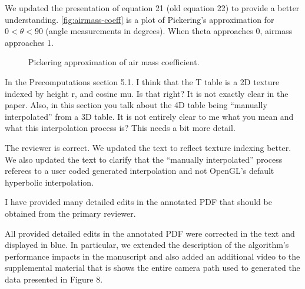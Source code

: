 \documentclass{article}
\begin{document}
We updated the presentation of equation 21 (old equation 22) to provide a better understanding. \autoref{fig:airmass-coeff} is a plot of Pickering's approximation for $0 < \theta < 90$ (angle measurements in degrees). When theta approaches 0, airmass approaches 1.

\begin{figure}[htb]
 \centering 
 \caption{Pickering approximation of air mass coefficient.}
 \label{fig:airmass-coeff}
\end{figure}

\vspace*{1cm}
\begin{tcolorbox}
In the Precomputations section 5.1. I think that the T table is a 2D texture indexed by height r, and cosine mu. Is that right? It is not exactly clear in the paper. Also, in this section you talk about the 4D table being ``manually interpolated'' from a 3D table. It is not entirely clear to me what you mean and what this interpolation process is? This needs a bit more detail.
\end{tcolorbox}

The reviewer is correct. We updated the text to reflect texture indexing better.
We also updated the text to clarify that the ``manually interpolated'' process referees to a user coded generated interpolation and not OpenGL's default hyperbolic interpolation. 

\vspace*{1cm}
\begin{tcolorbox}
I have provided many detailed edits in the annotated PDF that should be obtained from the primary reviewer.
\end{tcolorbox}

All provided detailed edits in the annotated PDF were corrected in the text and displayed in blue.  In particular, we extended the description of the algorithm's performance impacts in the manuscript and also added an additional video to the supplemental material that is shows the entire camera path used to generated the data presented in Figure 8.
\end{document}
